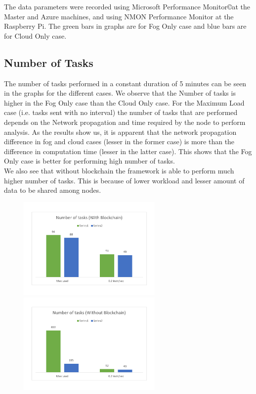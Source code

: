 \documentclass[AMA,STIX1COL]{WileyNJD-v2}
\begin{document}
The data parameters were recorded using Microsoft Performance Monitor\copyright at the Master and Azure machines, and using NMON Performance Monitor at the Raspberry Pi. The green bars in graphs are for Fog Only case and blue bars are for Cloud Only case.

\subsection{Number of Tasks}

The number of tasks performed in a constant duration of 5 minutes can be seen in the graphs for the different cases. We observe that the Number of tasks is higher in the Fog Only case than the Cloud Only case. For the Maximum Load case (i.e. tasks sent with no interval) the number of tasks that are performed depends on the Network propagation and time required by the node to perform analysis. As the results show us, it is apparent that the network propagation difference in fog and cloud cases (lesser in the former case) is more than the difference in computation time (lesser in the latter case). This shows that the Fog Only case is better for performing high number of tasks.\\
We also see that without blockchain the framework is able to perform much higher number of tasks. This is because of lower workload and lesser amount of data to be shared among nodes.
\begin{figure}[h]
\centering
\includegraphics[width=7cm]{g11} \ \ \ \ \ \ \ \ \ \ \       
\includegraphics[width=7cm]{g12}
\end{figure}
\end{document}
